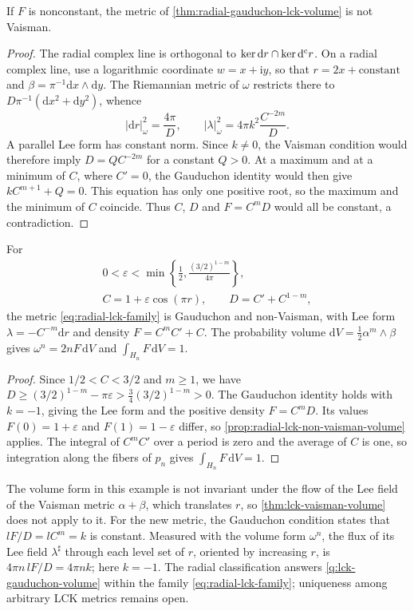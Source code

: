 \begin{proposition}\label{prop:radial-lck-non-vaisman-volume}
If $F$ is nonconstant, the metric of \cref{thm:radial-gauduchon-lck-volume} is not Vaisman.
\end{proposition}
\begin{proof}
The radial complex line is orthogonal to $\ker\mathrm dr\cap\ker\mathrm d^{\mathrm c} r$. On a radial complex line, use a logarithmic coordinate $w=x+\mathrm i y$, so that $r=2x+\text{constant}$ and $\beta=\pi^{-1}\mathrm dx\wedge\mathrm dy$. The Riemannian metric of $\omega$ restricts there to $D\pi^{-1}(\mathrm dx^2+\mathrm dy^2)$, whence
\[
 |\mathrm dr|_\omega^2=\frac{4\pi}{D},\qquad
 |\lambda|_\omega^2=4\pi k^2\frac{C^{-2m}}{D}.
\]
A parallel Lee form has constant norm. Since $k\ne0$, the Vaisman condition would therefore imply $D=Q C^{-2m}$ for a constant $Q>0$. At a maximum and at a minimum of $C$, where $C'=0$, the Gauduchon identity would then give $kC^{m+1}+Q=0$. This equation has only one positive root, so the maximum and the minimum of $C$ coincide. Thus $C$, $D$ and $F=C^mD$ would all be constant, a contradiction.
\end{proof}

\begin{example}\label{ex:radial-gauduchon-non-vaisman}
For
\[
 \begin{gathered}
 0<\varepsilon<\min\left\{\frac12,
                \frac{(3/2)^{1-m}}{4\pi}\right\},
 \\
 C=1+\varepsilon\cos(\pi r),\qquad
 D=C'+C^{1-m},
 \end{gathered}
\]
the metric \eqref{eq:radial-lck-family} is Gauduchon and non-Vaisman, with Lee form $\lambda=-C^{-m}\mathrm dr$ and density $F=C^mC'+C$. The probability volume $\mathrm dV=\frac12\alpha^m\wedge\beta$ gives $\omega^n=2nF\,\mathrm dV$ and $\int_{H_n}F\,\mathrm dV=1$.
\end{example}
\begin{proof}
Since $1/2<C<3/2$ and $m\geq1$, we have
$D\geq(3/2)^{1-m}-\pi\varepsilon>\frac34(3/2)^{1-m}>0$.
The Gauduchon identity holds with $k=-1$, giving the Lee form and the positive density $F=C^mD$. Its values $F(0)=1+\varepsilon$ and $F(1)=1-\varepsilon$ differ, so \cref{prop:radial-lck-non-vaisman-volume} applies. The integral of $C^mC'$ over a period is zero and the average of $C$ is one, so integration along the fibers of $p_n$ gives $\int_{H_n}F\,\mathrm dV=1$.
\end{proof}

The volume form in this example is not invariant under the flow of the Lee field of the Vaisman metric $\alpha+\beta$, which translates $r$, so \cref{thm:lck-vaisman-volume} does not apply to it. For the new metric, the Gauduchon condition states that $lF/D=lC^m=k$ is constant. Measured with the volume form $\omega^n$, the flux of its Lee field $\lambda^\sharp$ through each level set of $r$, oriented by increasing $r$, is $4\pi n\,lF/D=4\pi nk$; here $k=-1$. The radial classification answers \cref{q:lck-gauduchon-volume} within the family \eqref{eq:radial-lck-family}; uniqueness among arbitrary LCK metrics remains open.
